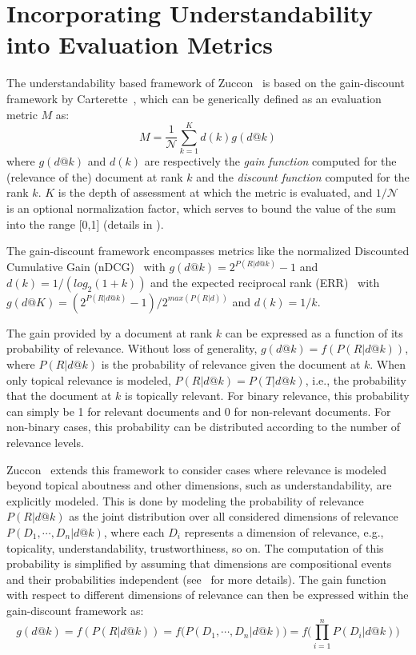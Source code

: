 \section{Incorporating Understandability into Evaluation Metrics}
\label{sec:understandability_metrics}

The understandability based framework of Zuccon~\cite{zuccon16} is based on the gain-discount framework by Carterette~\cite{carterette11}, which can be generically defined as an evaluation metric $M$ as:
%
\begin{equation}
M=\frac{1}{\mathcal{N}} \sum_{k=1}^{K} d(k) g(d@k)
\end{equation}
%
where $g(d@k)$ and $d(k)$ are respectively the \textit{gain function} computed for the (relevance of the) document at rank $k$ and the \textit{discount function} computed for the rank $k$.
$K$ is the depth of assessment at which the metric is evaluated, and $1/\mathcal{N}$ is an optional normalization factor, which serves to bound the value of the sum into the range [0,1] (details in \cite{smucker12}).

The gain-discount framework encompasses metrics like the normalized Discounted Cumulative Gain (nDCG)~\cite{jarvelin02} with $g(d@k) = 2^{P(R|d@k)} - 1$ and $d(k) = 1/(log_2(1 + k))$ 
and the expected reciprocal rank (ERR)~\cite{chapelle09} with $g(d@K) =  (2^{P (R|d@k)} - 1)/2^{max(P (R|d))}$ and $d(k) = 1/k$.

The gain provided by a document at rank $k$ can be expressed as a function of its probability of relevance. Without loss of generality, $g(d@k) = f(P(R|d@k))$, where $P(R|d@k)$ is the probability of relevance given the document at $k$. 
When only topical relevance is modeled, $P(R|d@k) = P(T|d@k)$, i.e., the probability that the document at $k$ is topically relevant. 
For binary relevance, this probability can simply be 1 for relevant documents and 0 for non-relevant documents. For non-binary cases, this probability can be distributed according to the number of relevance levels.

Zuccon~\cite{zuccon16} extends this framework to consider cases where relevance is modeled beyond topical aboutness and other dimensions, such as understandability, are explicitly modeled.
This is done by modeling the probability of relevance $P(R|d@k)$ as the joint distribution over all considered dimensions of relevance $P(D_1, \cdots, D_n|d@k)$, where  each $D_i$ represents a dimension of relevance, e.g., topicality, understandability, trustworthiness, so on. The computation of this probability is simplified by assuming  that dimensions are compositional events and their probabilities independent (see~\cite{zuccon16} for more details). The gain function with respect to different dimensions of relevance can then be expressed within the gain-discount framework as:
%
\begin{equation}
g(d@k) = f(P(R|d@k)) = f\big(P(D_1, \cdots, D_n|d@k)\big) = f\Big(\prod_{i=1}^n P(D_i|d@k)\Big) 
\end{equation}
%

